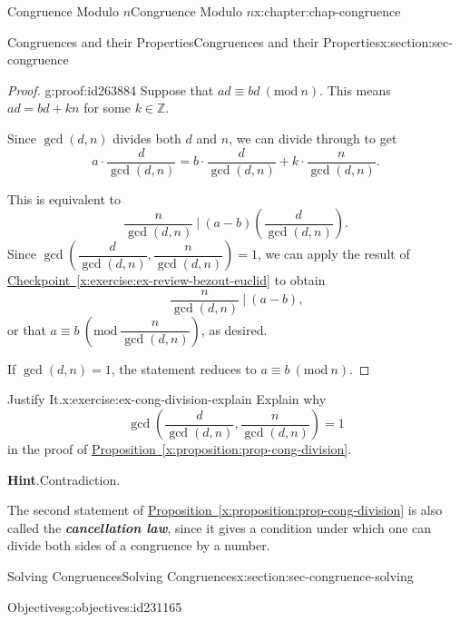 \documentclass[oneside,10pt,]{book}
\newcommand{\blocktitlefont}{\relax}
\newcommand{\xreffont}{\relax}
\newcommand{\alert}[1]{\textbf{\textit{#1}}}
\numberwithin{equation}{section}
\newcommand{\Mod}[1]{\ \left(\mathrm{mod}\ #1\right)}
\begin{document}
\begin{chapterptx}{Congruence Modulo \(n\)}{}{Congruence Modulo \(n\)}{}{}{x:chapter:chap-congruence}
\begin{sectionptx}{Congruences and their Properties}{}{Congruences and their Properties}{}{}{x:section:sec-congruence}
\begin{proof}{}{g:proof:id263884}
Suppose that \(ad \equiv bd \Mod{n}\). This means \(ad = bd + kn\) for some \(k \in \mathbb{Z}\).%
\par
Since \(\gcd(d,n)\) divides both \(d\) and \(n\), we can divide through to get%
\begin{equation*}
a\cdot \dfrac{d}{\gcd(d,n)} = b\cdot \dfrac{d}{\gcd(d,n)} + k \cdot\dfrac{n}{\gcd(d,n)}\text{.}
\end{equation*}
%
\par
This is equivalent to%
\begin{equation*}
\dfrac{n}{\gcd(d,n)} \ \Biggl\vert \ (a-b)\left(\dfrac{d}{\gcd(d,n)}\right)\text{.}
\end{equation*}
Since \(\gcd\left(\dfrac{d}{\gcd(d,n)},\dfrac{n}{\gcd(d,n)}\right) = 1\), we can apply the result of \hyperref[x:exercise:ex-review-bezout-euclid]{Checkpoint~{\xreffont\ref{x:exercise:ex-review-bezout-euclid}}} to obtain%
\begin{equation*}
\dfrac{n}{\gcd(d,n)} \ \Biggl\vert \ (a-b)\text{,}
\end{equation*}
or that \(a \equiv b \Mod{\dfrac{n}{\gcd(d,n)}}\), as desired.%
\par
If \(\gcd(d,n) = 1\), the statement reduces to \(a \equiv b \Mod{n}\).%
\end{proof}
\begin{inlineexercise}{Justify It.}{x:exercise:ex-cong-division-explain}%
Explain why%
\begin{equation*}
\gcd\left(\dfrac{d}{\gcd(d,n)},\dfrac{n}{\gcd(d,n)}\right) = 1
\end{equation*}
in the proof of \hyperref[x:proposition:prop-cong-division]{Proposition~{\xreffont\ref{x:proposition:prop-cong-division}}}.%
\par\smallskip%
\noindent\textbf{\blocktitlefont Hint}.\hypertarget{g:hint:id232163}{}\quad{}Contradiction.%
\end{inlineexercise}
The second statement of \hyperref[x:proposition:prop-cong-division]{Proposition~{\xreffont\ref{x:proposition:prop-cong-division}}} is also called the \alert{cancellation law}, since it gives a condition under which one can divide both sides of a congruence by a number.%
\end{sectionptx}
%
%
\typeout{************************************************}
\typeout{************************************************}
%
\begin{sectionptx}{Solving Congruences}{}{Solving Congruences}{}{}{x:section:sec-congruence-solving}
\begin{objectives}{Objectives}{g:objectives:id231165}

\end{objectives}
\end{sectionptx}
\end{chapterptx}
\end{document}
